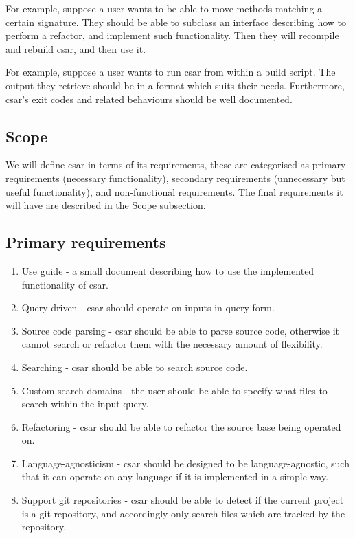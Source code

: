 \documentclass[12pt, letterpaper]{article}
\begin{document}
For example, suppose a user wants to be able to move methods matching a certain signature.
They should be able to subclass an interface describing how to perform a refactor, and implement such functionality.
Then they will recompile and rebuild csar, and then use it.

For example, suppose a user wants to run csar from within a build script.
The output they retrieve should be in a format which suits their needs.
Furthermore, csar's exit codes and related behaviours should be well documented.

\subsection{Scope}
We will define csar in terms of its requirements, these are categorised as primary requirements (necessary functionality), secondary requirements (unnecessary but useful functionality), and non-functional requirements.
The final requirements it will have are described in the Scope subsection.

\subsection{Primary requirements}
\begin{enumerate}
  \item Use guide - a small document describing how to use the implemented functionality of csar.
  \item Query-driven - csar should operate on inputs in query form.
  \item Source code parsing - csar should be able to parse source code, otherwise it cannot search or refactor them with the necessary amount of flexibility.
  \item Searching - csar should be able to search source code.
  \item Custom search domains - the user should be able to specify what files to search within the input query.
  \item Refactoring - csar should be able to refactor the source base being operated on.
  \item Language-agnosticism - csar should be designed to be language-agnostic, such that it can operate on any language if it is implemented in a simple way.
  \item Support git repositories - csar should be able to detect if the current project is a git repository, and accordingly only search files which are tracked by the repository.
\end{enumerate}
\end{document}

